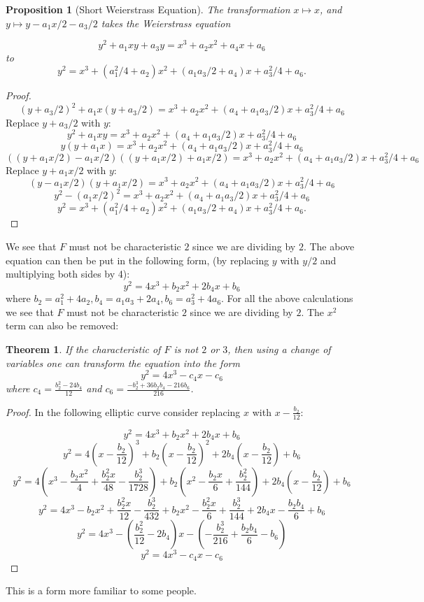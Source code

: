 \documentclass{article}
\newtheorem{theorem}{Theorem}[section]
\newtheorem{prop}{Proposition}[section]
\theoremstyle{definition}
\theoremstyle{definition}
\theoremstyle{definition}
\begin{document}
\begin{prop}[Short Weierstrass Equation]The transformation $x\mapsto x$, and  $y\mapsto y-a_1x/2-a_3/2$ takes the Weierstrass equation 

$$y^2+a_1xy+a_3y=x^3+a_2x^2+a_4x+a_6$$
to
    $$y^2=x^3+(a_1^2/4+a_2)x^2+(a_1a_3/2+a_4)x+a_3^2/4+a_6.$$
\end{prop}
\begin{proof}
   
$$(y+a_3/2)^2+ a_1x(y+a_3/2)=x^3+a_2x^2+(a_4+a_1a_3/2)x+a_3^2/4+a_6$$
Replace $y+a_3/2$ with $y$:
$$y^2+a_1xy=x^3+a_2x^2+(a_4+a_1a_3/2)x+a_3^2/4+a_6$$
$$y(y+a_1x)=x^3+a_2x^2+(a_4+a_1a_3/2)x+a_3^2/4+a_6$$
$$((y+a_1x/2)-a_1x/2)((y+a_1x/2)+a_1x/2)=x^3+a_2x^2+(a_4+a_1a_3/2)x+a_3^2/4+a_6$$
Replace $y+a_1x/2$ with $y$:
$$(y-a_1x/2)(y+a_1x/2)=x^3+a_2x^2+(a_4+a_1a_3/2)x+a_3^2/4+a_6$$
$$y^2-(a_1x/2)^2=x^3+a_2x^2+(a_4+a_1a_3/2)x+a_3^2/4+a_6$$
$$y^2=x^3+(a_1^2/4+a_2)x^2+(a_1a_3/2+a_4)x+a_3^2/4+a_6.$$
 
\end{proof}

We see that $F$ must not be characteristic $2$ since we are dividing by $2$.
The above equation can then be put in the following form, (by replacing $y$ with $y/2$ and multiplying both sides by 4):
 $$y^2=4x^3+b_2x^2+2b_4x+b_6$$ 
 where $b_2=a_1^2+4a_2,b_4=a_1a_3+2a_4, b_6=a_3^2+4a_6$.
\newline\newline
For all the above calculations we see that $F$ must not be characteristic $2$ since we are dividing by $2$.
\newline\newline
The $x^2$ term can also be removed: 

\begin{theorem}If the characteristic of $F$ is not $2$ or $3$, then using a change of variables one can transform the equation into the form
$$y^2=4x^3-c_4x-c_6$$
where $c_4=\frac{b_2^2-24b_4}{12}$ and $c_6=\frac{-b_2^3+36b_2b_4-216b_6}{216}$. 
\end{theorem}

\begin{proof}

    In the following elliptic curve consider replacing $x$ with $x-\frac{b_2}{12}$:
    
    $$y^2=4x^3+b_2x^2+2b_4x+b_6$$
    $$y^2=4(x-\frac{b_2}{12})^3+b_2(x-\frac{b_2}{12})^2+2b_4(x-\frac{b_2}{12})+b_6$$
    $$y^2=4(x^3-\frac{b_2x^2}{4}+\frac{b_2^2x}{48}-\frac{b_2^3}{1728})+b_2(x^2-\frac{b_2x}{6}+\frac{b_2^2}{144})+2b_4(x-\frac{b_2}{12})+b_6$$
    $$y^2=4x^3-b_2x^2+\frac{b_2^2x}{12}-\frac{b_2^3}{432}+b_2x^2-\frac{b_2^2x}{6}+\frac{b_2^3}{144}+2b_4x-\frac{b_2b_4}{6}+b_6$$
    $$y^2=4x^3-(\frac{b_2^2}{12}-2b_4)x-(-\frac{b_2^3}{216}+\frac{b_2b_4}{6}-b_6)$$
    $$y^2=4x^3-c_4x-c_6$$
\end{proof}
This is a form more familiar to some people.
\end{document}

